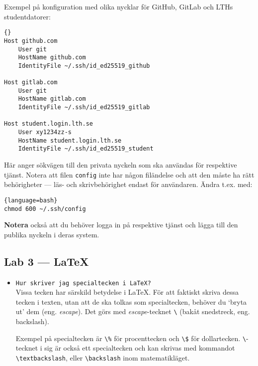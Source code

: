 \documentclass[fleqn, article, a4paper]{memoir}
\newcommand{\file}[1]{\texttt{#1}}
\begin{document}
\begin{itemize}
          Exempel på konfiguration med olika nycklar för GitHub, GitLab och LTHs studentdatorer:
          \begin{lstlisting}{}
Host github.com
    User git
    HostName github.com
    IdentityFile ~/.ssh/id_ed25519_github

Host gitlab.com
    User git
    HostName gitlab.com
    IdentityFile ~/.ssh/id_ed25519_gitlab

Host student.login.lth.se
    User xy1234zz-s
    HostName student.login.lth.se
    IdentityFile ~/.ssh/id_ed25519_student
          \end{lstlisting}

          Här anger  sökvägen till den privata nyckeln som ska användas för respektive tjänst. Notera att filen \file{config} inte har någon filändelse och att den måste ha rätt behörigheter --- läs- och skrivbehörighet endast för användaren. Ändra t.ex. med:
		  \begin{lstlisting}{language=bash}
chmod 600 ~/.ssh/config
		  \end{lstlisting}

          \textbf{Notera} också att du behöver logga in på respektive tjänst och lägga till den publika nyckeln i deras system.
\end{itemize}

\subsection{Lab 3 --- \LaTeX}
\begin{itemize}
    \item \texttt{Hur skriver jag specialtecken i \LaTeX{}?}\\
          Vissa tecken har särskild betydelse i \LaTeX{}. För att faktiskt skriva dessa tecken i texten, utan att de ska tolkas som specialtecken, behöver du \enquote*{bryta ut} dem (eng. \emph{escape}). Det görs med \emph{escape}-tecknet \texttt{\textbackslash} (bakåt snedstreck, eng. backslash). 

          Exempel på specialtecken är \texttt{\textbackslash\%} för procenttecken och \texttt{\textbackslash\$} för dollartecken. \texttt{\textbackslash}-tecknet i sig är också ett specialtecken och kan skrivas med kommandot \texttt{\textbackslash{textbackslash}}, eller \texttt{\textbackslash{backslash}} inom matematikläget.
\end{itemize}
\end{document}
